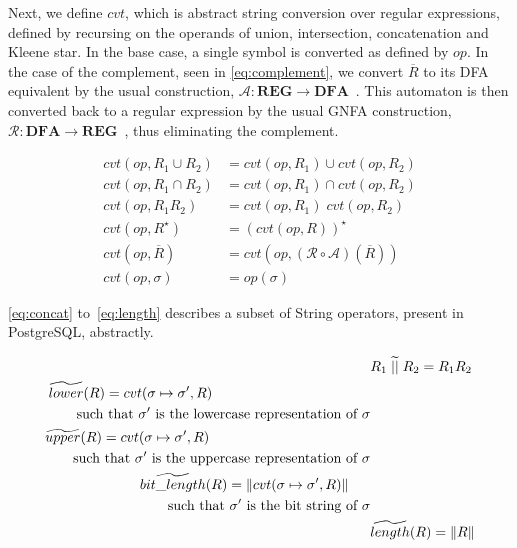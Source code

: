 Next, we define $cvt$, which is abstract string conversion over regular expressions, defined by recursing on the operands of union, intersection, concatenation and Kleene star.
In the base case, a single symbol is converted as defined by $op$.
In the case of the complement, seen in \autoref{eq:complement}, we convert $\overline{R}$ to its DFA equivalent by the usual construction, $\mathcal{A}:\mathbf{REG} \rightarrow \mathbf{DFA}$~\cite{sipserbook}.
This automaton is then converted back to a regular expression by the usual GNFA construction, $\mathcal{R}: \mathbf{DFA} \rightarrow \mathbf{REG}$~\cite{sipserbook}, thus eliminating the complement.

\begin{align}
    cvt(op, R_1 \cup R_2) &= cvt(op, R_1) \cup cvt(op, R_2) \\
    cvt(op, R_1 \cap R_2) &= cvt(op, R_1) \cap cvt(op, R_2) \\
    cvt(op, R_1 R_2) &= cvt(op, R_1) \; cvt(op, R_2) \\
    cvt(op, R^\star) &= (cvt(op, R))^\star \\
    cvt(op, \overline{R}) &= cvt(op, (\mathcal{R} \circ \mathcal{A}) (\overline{R})) \label{eq:complement} \\
    cvt(op, \sigma) &= op(\sigma)
\end{align}

\autoref{eq:concat} to~\ref{eq:length} describes a subset of String operators, present in PostgreSQL, abstractly.

\begin{align}\label{eq:concat}
    &R_1 \;\aab{||}\; R_2 = R_1 R_2 \\
    \begin{split}
        &\aab{lower}(R) = cvt(\sigma \mapsto \sigma', R) \\
        & \quad \quad \text{such } \text{that } \sigma' \text{ is the lowercase representation of } \sigma
    \end{split}\\
    \begin{split}
        & \aab{upper}(R) = cvt(\sigma \mapsto \sigma', R) \\
        & \quad \quad \text{such } \text{that $\sigma'$ is the uppercase representation of $\sigma$}
    \end{split}\\
    \begin{split}
        &\aab{bit\_length}(R) = \|cvt(\sigma \mapsto \sigma', R)\| \\
        & \quad \quad \text{such } \text{that $\sigma'$ is the bit string of $\sigma$}
    \end{split} \\ \label{eq:length}
    &\aab{length}(R) = \|R\|
\end{align}

